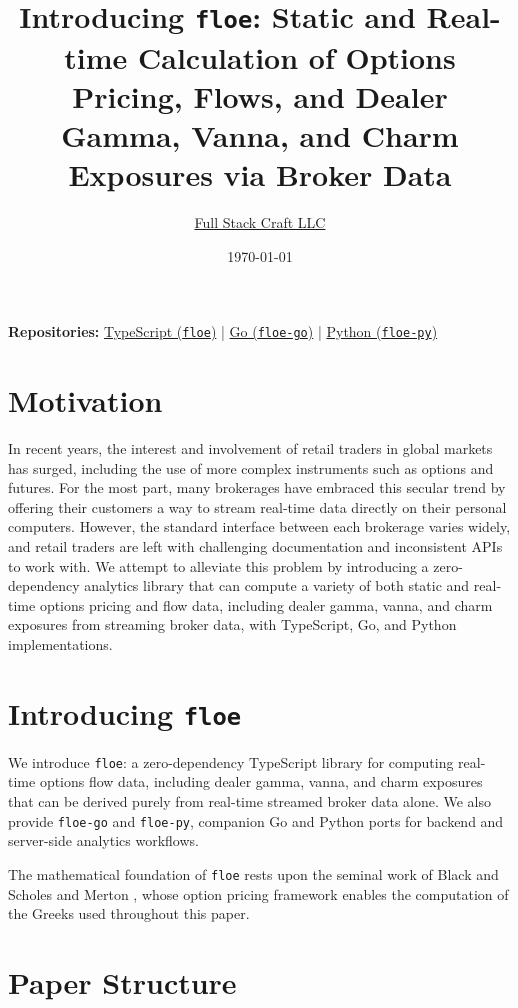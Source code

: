 \documentclass[11pt, a4paper]{article}
\title{Introducing \texttt{floe}: Static and Real-time Calculation of Options Pricing, Flows, and Dealer Gamma, Vanna, and Charm Exposures via Broker Data}
\author{\href{https://fullstackcraft.com}{Full Stack Craft LLC}}
\date{\today}
\begin{document}
\maketitle
\noindent\textbf{Repositories:}
\href{https://github.com/FullStackCraft/floe}{TypeScript (\texttt{floe})}
\quad|\quad
\href{https://github.com/FullStackCraft/floe-go}{Go (\texttt{floe-go})}
\quad|\quad
\href{https://fullstackcraft.github.io/floe-py/}{Python (\texttt{floe-py})}
\medskip
\tableofcontents
\newpage

\section{Motivation}

In recent years, the interest and involvement of retail traders in global markets has surged, including the use of more complex instruments such as options and futures. For the most part, many brokerages have embraced this secular trend by offering their customers a way to stream real-time data directly on their personal computers. However, the standard interface between each brokerage varies widely, and retail traders are left with challenging documentation and inconsistent APIs to work with. We attempt to alleviate this problem by introducing a zero-dependency analytics library that can compute a variety of both static and real-time options pricing and flow data, including dealer gamma, vanna, and charm exposures from streaming broker data, with TypeScript, Go, and Python implementations.

\section{Introducing \texttt{floe}}

We introduce \texttt{floe}: a zero-dependency TypeScript library for computing real-time options flow data, including dealer gamma, vanna, and charm exposures that can be derived purely from real-time streamed broker data alone. We also provide \texttt{floe-go} and \texttt{floe-py}, companion Go and Python ports for backend and server-side analytics workflows.

The mathematical foundation of \texttt{floe} rests upon the seminal work of Black and Scholes \cite{black1973pricing} and Merton \cite{merton1973theory}, whose option pricing framework enables the computation of the Greeks used throughout this paper.

\section{Paper Structure}
\end{document}
